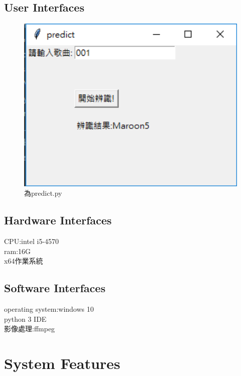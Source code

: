 \documentclass{article}
\begin{document}
\begin{CJK}{UTF8}{bkai}
\subsection{\Large User Interfaces\\}
\begin{figure}[h]
\begin{center}
\includegraphics[width=15cm]{ui.png}
\end{center}
\caption{為predict.py}
\label{fig:1}
\end{figure}
\subsection{\Large Hardware Interfaces\\}
CPU:intel i5-4570\\
ram:16G\\
x64作業系統\\

\newpage
\subsection{\Large Software Interfaces\\}
operating system:windows 10\\
python 3 IDE \\
影像處理:ffmpeg\\

\newpage



\section{\huge\bf \color{blue}  System Features }

\end{CJK}
\end{document}
